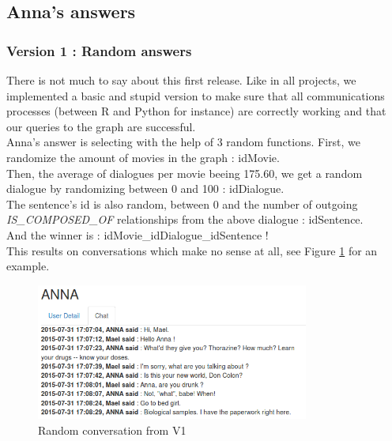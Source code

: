 %
\subsection{Anna's answers}
\label{sub:Answering}

\subsubsection{Version 1 : Random answers}
\label{sssec:v_rand}
There is not much to say about this first release. Like in all projects, we implemented a basic and stupid version to make sure that all communications processes (between R and Python for instance) are correctly working and that our queries to the graph are successful.\\
Anna's answer is selecting with the help of 3 random functions. First, we randomize the amount of movies in the graph : idMovie.\\
Then, the average of dialogues per movie beeing 175.60, we get a random dialogue by randomizing between 0 and 100 : idDialogue.\\
The sentence's id is also random, between 0 and the number of outgoing \textit{IS\_COMPOSED\_OF} relationships from the above dialogue : idSentence.\\
And the winner is : idMovie\_idDialogue\_idSentence !\\
This results on conversations which make no sense at all, see Figure \ref{fig:convRandom} for an example.\\
\begin{figure}[!h]
\begin{center}
\includegraphics[width=0.80\textwidth]{./img/convRandom.png}
\end{center}
\caption{Random conversation from V1}
\label{fig:convRandom}
\end{figure}
